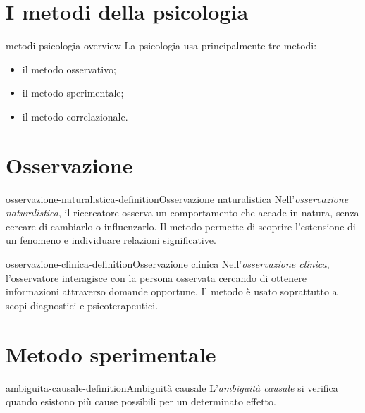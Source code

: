 \documentclass[preview]{standalone}
\begin{document}
\genpage

\section{I metodi della psicologia}

\begin{snippet}{metodi-psicologia-overview}
    La psicologia usa principalmente tre metodi:
    \begin{itemize}
        \item il metodo osservativo;
        \item il metodo sperimentale;
        \item il metodo correlazionale.
    \end{itemize}
\end{snippet}

\section{Osservazione}

\begin{snippetdefinition}{osservazione-naturalistica-definition}{Osservazione naturalistica}
    Nell'\emph{osservazione naturalistica}, il ricercatore osserva un
    comportamento che accade in natura, senza cercare di cambiarlo o
    influenzarlo. Il metodo permette di scoprire l'estensione di un fenomeno e
    individuare relazioni significative.
\end{snippetdefinition}

\begin{snippetdefinition}{osservazione-clinica-definition}{Osservazione clinica}
    Nell'\emph{osservazione clinica}, l'osservatore interagisce con la persona
    osservata cercando di ottenere informazioni attraverso domande opportune.
    Il metodo è usato soprattutto a scopi diagnostici e psicoterapeutici.
\end{snippetdefinition}

\section{Metodo sperimentale}

\begin{snippetdefinition}{ambiguita-causale-definition}{Ambiguità causale}
    L'\emph{ambiguità causale} si verifica quando esistono più cause possibili
    per un determinato effetto.
\end{snippetdefinition}
\end{document}
